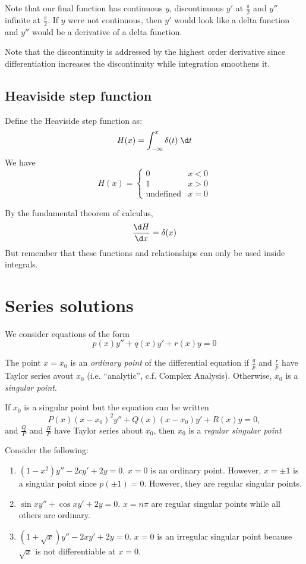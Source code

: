 \documentclass[a4paper]{article}
\begin{document}
Note that our final function has continuous $y$, discontinuous $y'$ at $\frac{\pi}{2}$ and $y''$ infinite at $\frac{\pi}{2}$. If $y$ were not continuous, then $y'$ would look like a delta function and $y''$ would be a derivative of a delta function.

Note that the discontinuity is addressed by the highest order derivative since differentiation increases the discontinuity while integration smoothens it.

\subsection{Heaviside step function}

\begin{defi}
  Define the Heaviside step function as:
  \[
  H(x) = \int_{-\infty}^x \delta(t) \;\d t
  \]
  We have
  \[
  H(x) =\begin{cases} 0 & x < 0\\1 & x > 0\\\text{undefined} & x = 0\end{cases}
  \]


By the fundamental theorem of calculus, 
\[
\frac{\d H}{\d x} = \delta(x)
\]
But remember that these functions and relationships can only be used inside integrals.
\end{defi}

\section{Series solutions}
We consider equations of the form 
\[
p(x) y'' + q(x) y' + r(x) y = 0
\]

\begin{defi}
  The point $x = x_0$ is an \emph{ordinary point} of the differential equation if $\frac{q}{p}$ and $\frac{r}{p}$ have Taylor series avout $x_0$ (i.e. ``analytic'', c.f. Complex Analysis). Otherwise, $x_0$ is a \emph{singular point}.

If $x_0$ is a singular point but the equation can be written
\[
P(x)(x - x_0)^2y'' + Q(x)(x - x_0)y' + R(x)y = 0,
\]
and $\frac{Q}{P}$ and $\frac{R}{P}$ have Taylor series about $x_0$, then $x_0$ is a \emph{regular singular point}
\end{defi}

\begin{eg}
  Consider the following:
  \begin{enumerate}
  \item $(1 - x^2)y'' - 2cy' + 2y = 0$. $x = 0$ is an ordinary point. However, $x = \pm 1$ is a singular point since $p(\pm 1) = 0$. However, they are regular singular points.
  \item $\sin x y'' + \cos x y' + 2y = 0$. $x = n\pi$ are regular singular points while all others are ordinary.
  \item $(1 + \sqrt{x}) y'' - 2xy' + 2y = 0$. $x = 0$ is an irregular singular point because $\sqrt{x}$ is not differentiable at $x = 0$.
  \end{enumerate}
\end{eg}
\end{document}
